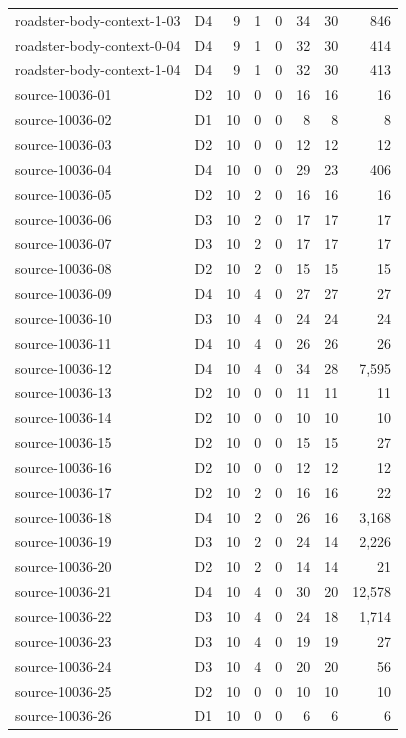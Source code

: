 \begin{longtable}{p{}lrrrrrr}
roadster-body-context-1-03 & D4 & 9 & 1 & 0 & 34 & 30 & 846\\
roadster-body-context-0-04 & D4 & 9 & 1 & 0 & 32 & 30 & 414\\
roadster-body-context-1-04 & D4 & 9 & 1 & 0 & 32 & 30 & 413\\
source-10036-01 & D2 & 10 & 0 & 0 & 16 & 16 & 16\\
source-10036-02 & D1 & 10 & 0 & 0 & 8 & 8 & 8\\
source-10036-03 & D2 & 10 & 0 & 0 & 12 & 12 & 12\\
source-10036-04 & D4 & 10 & 0 & 0 & 29 & 23 & 406\\
source-10036-05 & D2 & 10 & 2 & 0 & 16 & 16 & 16\\
source-10036-06 & D3 & 10 & 2 & 0 & 17 & 17 & 17\\
source-10036-07 & D3 & 10 & 2 & 0 & 17 & 17 & 17\\
source-10036-08 & D2 & 10 & 2 & 0 & 15 & 15 & 15\\
source-10036-09 & D4 & 10 & 4 & 0 & 27 & 27 & 27\\
source-10036-10 & D3 & 10 & 4 & 0 & 24 & 24 & 24\\
source-10036-11 & D4 & 10 & 4 & 0 & 26 & 26 & 26\\
source-10036-12 & D4 & 10 & 4 & 0 & 34 & 28 & 7,595\\
source-10036-13 & D2 & 10 & 0 & 0 & 11 & 11 & 11\\
source-10036-14 & D2 & 10 & 0 & 0 & 10 & 10 & 10\\
source-10036-15 & D2 & 10 & 0 & 0 & 15 & 15 & 27\\
source-10036-16 & D2 & 10 & 0 & 0 & 12 & 12 & 12\\
source-10036-17 & D2 & 10 & 2 & 0 & 16 & 16 & 22\\
source-10036-18 & D4 & 10 & 2 & 0 & 26 & 16 & 3,168\\
source-10036-19 & D3 & 10 & 2 & 0 & 24 & 14 & 2,226\\
source-10036-20 & D2 & 10 & 2 & 0 & 14 & 14 & 21\\
source-10036-21 & D4 & 10 & 4 & 0 & 30 & 20 & 12,578\\
source-10036-22 & D3 & 10 & 4 & 0 & 24 & 18 & 1,714\\
source-10036-23 & D3 & 10 & 4 & 0 & 19 & 19 & 27\\
source-10036-24 & D3 & 10 & 4 & 0 & 20 & 20 & 56\\
source-10036-25 & D2 & 10 & 0 & 0 & 10 & 10 & 10\\
source-10036-26 & D1 & 10 & 0 & 0 & 6 & 6 & 6\\

\end{longtable}
